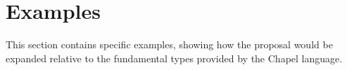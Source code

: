\section{Examples}

This section contains specific examples, showing how the proposal would be expanded
relative to the fundamental types provided by the Chapel language.


